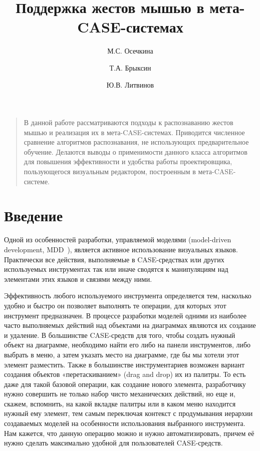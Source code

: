 \documentclass[a5paper]{article}
\title{Поддержка жестов мышью в мета-CASE-системах}
\author{М.С. Осечкина \and Т.А. Брыксин \and Ю.В. Литвинов}
\date{}
\begin{document}
\maketitle
\thispagestyle{empty}

\begin{quote}
\small\noindent
В данной работе рассматриваются подходы к распознаванию жестов мышью и реализация их в мета-CASE-системах. Приводится численное сравнение алгоритмов распознавания, не использующих предварительное обучение. Делаются выводы о применимости данного класса алгоритмов для повышения эффективности и удобства работы проектировщика, пользующегося визуальным редактором, построенным в мета-CASE-системе.
\end{quote}

\section*{Введение}
Одной из особенностей разработки, управляемой моделями (model-driven development, MDD~\cite{mde}), является активное использование визуальных языков. Практически все действия, выполняемые в CASE-средствах или других используемых инструментах так или иначе сводятся к манипуляциям над элементами этих языков и связями между ними. 

Эффективность любого используемого инструмента определяется тем, насколько удобно и быстро он позволяет выполнять те операции, для которых этот инструмент предназначен. В процессе разработки моделей одними из наиболее часто выполняемых действий над объектами на диаграммах являются их создание и удаление.  В большинстве CASE-средств для того, чтобы создать нужный объект на диаграмме, необходимо найти его либо на панели инструментов, либо выбрать в меню, а затем указать место на диаграмме, где бы мы хотели этот элемент разместить. Также в большинстве инструментариев возможен вариант создания объектов «перетаскиванием» (drag and drop) их из палитры. То есть даже для такой базовой операции, как создание нового элемента, разработчику нужно совершить не только набор чисто механических действий, но еще и, скажем, вспомнить, на какой вкладке палитры или в каком меню находится нужный ему элемент, тем самым переключая контекст с продумывания иерархии создаваемых моделей на особенности использования выбранного инструмента. Нам кажется, что данную операцию можно и нужно автоматизировать, причем её нужно сделать максимально удобной для пользователей CASE-средств. 
\end{document}

